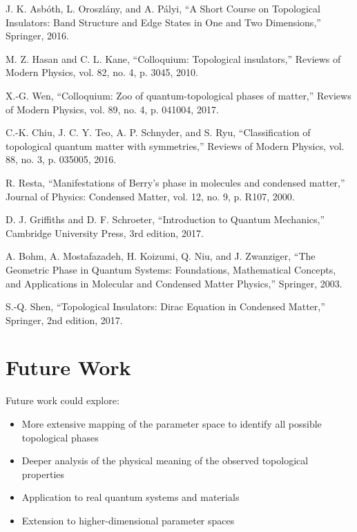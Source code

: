 \documentclass{article}
\begin{document}
\begin{thebibliography}{99}
 J. K. Asbóth, L. Oroszlány, and A. Pályi, ``A Short Course on Topological Insulators: Band Structure and Edge States in One and Two Dimensions,'' Springer, 2016.

 M. Z. Hasan and C. L. Kane, ``Colloquium: Topological insulators,'' Reviews of Modern Physics, vol. 82, no. 4, p. 3045, 2010.

 X.-G. Wen, ``Colloquium: Zoo of quantum-topological phases of matter,'' Reviews of Modern Physics, vol. 89, no. 4, p. 041004, 2017.

 C.-K. Chiu, J. C. Y. Teo, A. P. Schnyder, and S. Ryu, ``Classification of topological quantum matter with symmetries,'' Reviews of Modern Physics, vol. 88, no. 3, p. 035005, 2016.

 R. Resta, ``Manifestations of Berry's phase in molecules and condensed matter,'' Journal of Physics: Condensed Matter, vol. 12, no. 9, p. R107, 2000.

 D. J. Griffiths and D. F. Schroeter, ``Introduction to Quantum Mechanics,'' Cambridge University Press, 3rd edition, 2017.

 A. Bohm, A. Mostafazadeh, H. Koizumi, Q. Niu, and J. Zwanziger, ``The Geometric Phase in Quantum Systems: Foundations, Mathematical Concepts, and Applications in Molecular and Condensed Matter Physics,'' Springer, 2003.

 S.-Q. Shen, ``Topological Insulators: Dirac Equation in Condensed Matter,'' Springer, 2nd edition, 2017.

\end{thebibliography}

\section{Future Work}

Future work could explore:

\begin{itemize}
    \item More extensive mapping of the parameter space to identify all possible topological phases
    \item Deeper analysis of the physical meaning of the observed topological properties
    \item Application to real quantum systems and materials
    \item Extension to higher-dimensional parameter spaces
\end{itemize}
\end{document}
